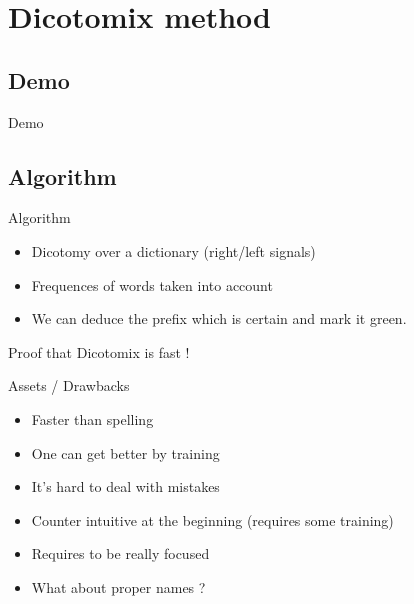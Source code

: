 \documentclass[notes]{beamer}
\begin{document}
\section{Dicotomix method}

\subsection{Demo}
\begin{frame}{Demo}
	\begin{center}
	\end{center}
\end{frame}

\subsection{Algorithm}
\begin{frame}{Algorithm}
	\begin{center}
		\begin{itemize}
			\item Dicotomy over a dictionary (right/left signals)
			\item Frequences of words taken into account
			\item We can deduce the prefix which is certain and mark it green.
		\end{itemize}
	\end{center}
\end{frame}

\begin{frame}{Proof that Dicotomix is fast !}
\end{frame}

\begin{frame}{Assets / Drawbacks}
	\begin{tcolorbox}[colback=green!5,colframe=green!40!black,title=Assets]
		\begin{itemize}
			\item Faster than spelling
			\item One can get better by training
		\end{itemize}
	\end{tcolorbox}
	\pause
	\begin{tcolorbox}[colback=red!5,colframe=red!40!black,title=Drawbacks]
		\begin{itemize}
			\item It's hard to deal with mistakes
			\item Counter intuitive at the beginning (requires some training)
			\item Requires to be really focused
			\item What about proper names ?
		\end{itemize}
	\end{tcolorbox}
\end{frame}
\end{document}
